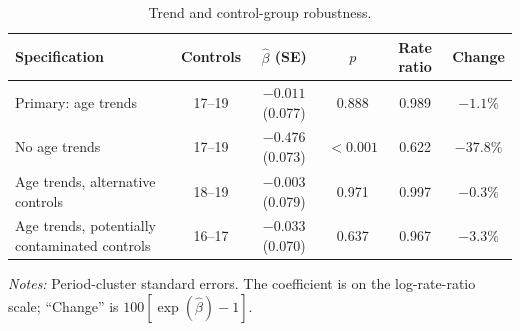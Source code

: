 \begin{table}[!htbp]
\centering
\caption{Trend and control-group robustness.}
\label{tab:registry_robustness}
\begingroup\footnotesize
\setlength{\tabcolsep}{4pt}
\begin{tabular}{@{}lccccc@{}}
\toprule
Specification & Controls & $\widehat\beta$ (SE) & $p$ & Rate ratio & Change \\
\midrule
Primary: age trends & 17--19 & $-0.011$ (0.077) & 0.888 & 0.989 & $-1.1\%$ \\
No age trends & 17--19 & $-0.476$ (0.073) & $<0.001$ & 0.622 & $-37.8\%$ \\
Age trends, alternative controls & 18--19 & $-0.003$ (0.079) & 0.971 & 0.997 & $-0.3\%$ \\
Age trends, potentially contaminated controls & 16--17 & $-0.033$ (0.070) & 0.637 & 0.967 & $-3.3\%$ \\
\bottomrule
\end{tabular}
\par\smallskip
\footnotesize\emph{Notes:} Period-cluster standard errors. The coefficient is on the
log-rate-ratio scale; ``Change'' is $100[\exp(\widehat\beta)-1]$.
\endgroup
\end{table}
